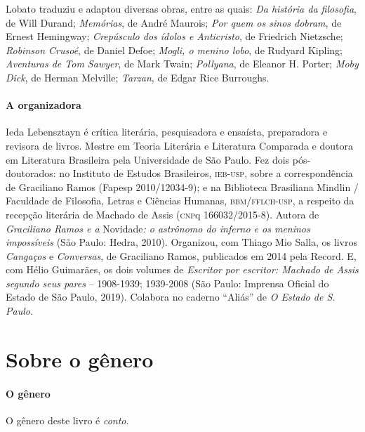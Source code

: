 \documentclass[11pt]{extarticle}
\begin{document}
Lobato traduziu e adaptou diversas obras, entre as quais: \emph{Da
história da filosofia}, de Will Durand; \emph{Memórias}, de André
Maurois; \emph{Por quem os sinos dobram}, de Ernest Hemingway;
\emph{Crepúsculo dos ídolos e Anticristo}, de Friedrich Nietzsche;
\emph{Robinson Crusoé}, de Daniel Defoe; \emph{Mogli, o menino lobo}, de
Rudyard Kipling; \emph{Aventuras de Tom Sawyer}, de Mark Twain;
\emph{Pollyana}, de Eleanor H. Porter; \emph{Moby Dick}, de Herman
Melville; \emph{Tarzan}, de Edgar Rice Burroughs.

\paragraph{A organizadora}
Ieda Lebensztayn é crítica literária, pesquisadora e ensaísta,
preparadora e revisora de livros. Mestre em Teoria Literária e
Literatura Comparada e doutora em Literatura Brasileira pela
Universidade de São Paulo. Fez dois pós-doutorados: no Instituto de
Estudos Brasileiros, \textsc{ieb-usp}, sobre a correspondência de
Graciliano Ramos (Fapesp 2010/12034-9); e na Biblioteca Brasiliana
Mindlin / Faculdade de Filosofia, Letras e Ciências Humanas,
\textsc{bbm/fflch-usp}, a respeito da recepção literária de Machado de
Assis (\textsc{cnp}q 166032/2015-8). Autora de \emph{Graciliano Ramos e
a} Novidade\emph{: o astrônomo do inferno e os meninos impossíveis} (São
Paulo: Hedra, 2010). Organizou, com Thiago Mio Salla, os livros
\emph{Cangaços} e \emph{Conversas}, de Graciliano Ramos, publicados em
2014 pela Record. E, com Hélio Guimarães, os dois volumes de
\emph{Escritor por escritor: Machado de Assis segundo seus pares} --
1908-1939; 1939-2008 (São Paulo: Imprensa Oficial do Estado de São
Paulo, 2019). Colabora no caderno ``Aliás'' de \emph{O Estado de S.
Paulo}.



\section{Sobre o gênero}

\paragraph{O gênero} O gênero deste livro é \textit{conto}. 
\end{document}
